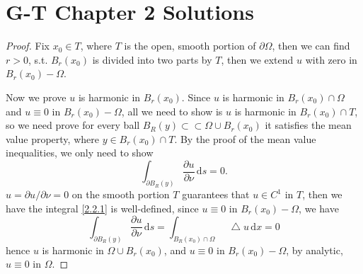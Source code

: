\documentclass[a4paper]{article}
\newcommand*\Laplace{\mathop{}\!\mathbin\bigtriangleup}
\newcommand\diff{\,\mathrm{d}}
\begin{document}
\section{G-T Chapter 2 Solutions}
\setcounter{proof}{1}
\begin{proof}
Fix $x_0 \in T$, where $T$ is the open, smooth portion of $\partial \Omega$, then we can find $r > 0$, s.t. $B_r(x_0)$ is 
divided into  two parts by $T$, then we extend $u$ with zero in $B_r(x_0)-\Omega$.

Now we prove $u$ is harmonic in $B_r(x_0)$. Since $u$ is harmonic in $B_r(x_0) \cap \Omega$ and 
$u \equiv 0$ in $B_r(x_0)-\Omega$, all we need to show is $u$ is harmonic in $B_r(x_0) \cap T$, 
so we need prove for every ball $B_R(y) \subset \subset \Omega \cup B_r(x_0)$ it satisfies the mean value property, 
where $y \in B_r(x_0) \cap T$. By the proof of the mean value inequalities, we only need to show
\begin{equation}\label{2.2.1}
\int_{\partial B_R(y)} \frac{\partial u}{\partial \nu} \diff s = 0.
\end{equation}
$u = \partial u/\partial \nu = 0$ on the smooth portion $T$ guarantees that $u \in C^1$ in $T$, 
then we have the integral \eqref{2.2.1} is well-defined, since $u \equiv 0$ in $B_r(x_0) - \Omega$, we have
\begin{equation*}
\int_{\partial B_R(y)} \frac{\partial u}{\partial \nu} \diff s = \int_{B_R(x_0) \cap \Omega} \Laplace u \diff x = 0
\end{equation*}
hence $u$ is harmonic in $\Omega\cup B_r(x_0)$, and $u \equiv 0$ in $B_r(x_0) - \Omega$, by analytic, $u \equiv 0$ in $\Omega$.
\end{proof}
\end{document}

